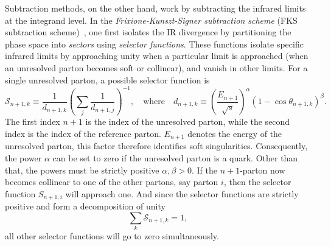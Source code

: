 Subtraction methods, on the other hand, work by subtracting the infrared limits at the integrand level. In the \textit{Frixione-Kunszt-Signer subtraction scheme} (FKS subtraction scheme)~\cite{Frixione:1995ms}, one first isolates the \acs{IR} divergence by partitioning the phase space into \textit{sectors} using \textit{selector functions}. These functions isolate specific infrared limits by approaching unity when a particular limit is approached (\eg when an unresolved parton becomes soft or collinear), and vanish in other limits. For a single unresolved parton, a possible selector function is
\begin{equation}
\mathcal{S}_{n+1,k} \equiv \frac{1}{d_{n+1,k}} \left(\sum_{j} \frac{1}{d_{n+1,j}} \right)^{-1}, \quad \text{where} \quad d_{n+1,k} \equiv \left(\frac{E_{n+1}}{\sqrt{s}}\right)^\alpha (1 - \cos \theta_{n+1,k})^\beta.
\end{equation}
The first index $n+1$ is the index of the unresolved parton, while the second index is the index of the reference parton. $E_{n+1}$ denotes the energy of the unresolved parton, this factor therefore identifies soft singularities. Consequently, the power $\alpha$ can be set to zero if the unresolved parton is a quark. Other than that, the powers must be strictly positive $\alpha, \beta > 0$. If the $n+1$-parton now becomes collinear to one of the other partons, say parton $i$, then the selector function $S_{n+1,i}$ will approach one. And since the selector functions are strictly positive and form a decomposition of unity
\begin{equation}
\sum_k \mathcal{S}_{n+1,k} = 1,
\end{equation}
all other selector functions will go to zero simultaneously.

